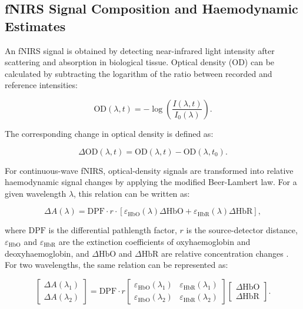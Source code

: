 \subsection{fNIRS Signal Composition and Haemodynamic Estimates}

An fNIRS signal is obtained by detecting near-infrared light intensity after scattering and
absorption in biological tissue. Optical density (OD) can be calculated by subtracting the logarithm
of the ratio between recorded and reference intensities:

\begin{equation}
\mathrm{OD}(\lambda,t)=-\log\left(\frac{I(\lambda,t)}{I_0(\lambda)}\right).
\end{equation}

The corresponding change in optical density is defined as:

\begin{equation}
\Delta \mathrm{OD}(\lambda,t)=\mathrm{OD}(\lambda,t)-\mathrm{OD}(\lambda,t_0).
\end{equation}

For continuous-wave fNIRS, optical-density signals are transformed into relative haemodynamic signal
changes by applying the modified Beer-Lambert law. For a given wavelength \(\lambda\), this relation
can be written as:

\begin{equation}
\Delta A(\lambda)= \mathrm{DPF} \cdot r \cdot
\left[
\varepsilon_{\mathrm{HbO}}(\lambda)\Delta \mathrm{HbO}+
\varepsilon_{\mathrm{HbR}}(\lambda)\Delta \mathrm{HbR}
\right],
\end{equation}

where \(\mathrm{DPF}\) is the differential pathlength factor, \(r\) is the source-detector distance,
\(\varepsilon_{\mathrm{HbO}}\) and \(\varepsilon_{\mathrm{HbR}}\) are the extinction coefficients of
oxyhaemoglobin and deoxyhaemoglobin, and \(\Delta \mathrm{HbO}\) and \(\Delta \mathrm{HbR}\) are
relative concentration changes \cite{Yucel2021,Amendola2023,Stute2025}. For two wavelengths, the
same relation can be represented as:

\begin{equation}
\begin{bmatrix}
\Delta A(\lambda_1)\\
\Delta A(\lambda_2)
\end{bmatrix}
=
\mathrm{DPF}\cdot r
\begin{bmatrix}
\varepsilon_{\mathrm{HbO}}(\lambda_1) & \varepsilon_{\mathrm{HbR}}(\lambda_1)\\
\varepsilon_{\mathrm{HbO}}(\lambda_2) & \varepsilon_{\mathrm{HbR}}(\lambda_2)
\end{bmatrix}
\begin{bmatrix}
\Delta \mathrm{HbO}\\
\Delta \mathrm{HbR}
\end{bmatrix}.
\end{equation}

